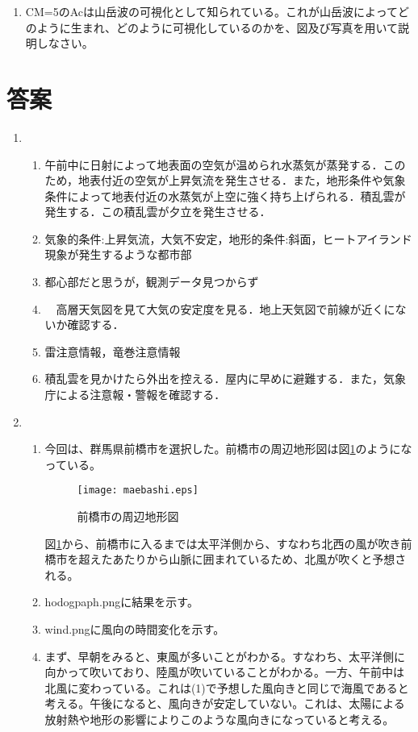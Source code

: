 \documentclass{jsarticle}
\newenvironment{problems}
{
  \renewcommand\labelenumi{\doublebox{\arabic{enumi}}}
  \begin{enumerate}
}{
  \end{enumerate}
  \renewcommand\labelenumi{\arabic{enumi}.}
}
\begin{document}
\begin{problems}
    \item CM=5のAcは山岳波の可視化として知られている。これが山岳波によってどのように生まれ、どのように可視化しているのかを、図及び写真を用いて説明しなさい。
    \end{problems}

\section{答案}

\begin{problems}
\item
        \begin{enumerate}[(1)]
        \item 午前中に日射によって地表面の空気が温められ水蒸気が蒸発する．このため，地表付近の空気が上昇気流を発生させる．また，地形条件や気象条件によって地表付近の水蒸気が上空に強く持ち上げられる．積乱雲が発生する．この積乱雲が夕立を発生させる．
        \item 気象的条件:上昇気流，大気不安定，地形的条件:斜面，ヒートアイランド現象が発生するような都市部
        \item 都心部だと思うが，観測データ見つからず
        \item　高層天気図を見て大気の安定度を見る．地上天気図で前線が近くにないか確認する．
        \item 雷注意情報，竜巻注意情報
        \item 積乱雲を見かけたら外出を控える．屋内に早めに避難する．また，気象庁による注意報・警報を確認する．
        \end{enumerate}
 \item
        \begin{enumerate}[(1)]
        \item 今回は、群馬県前橋市を選択した。前橋市の周辺地形図は図\ref{fig:maebashi}のようになっている。
        \begin{figure}[ptbh]
        \centering  %
        \texttt{[image: maebashi.eps]}
        \caption{前橋市の周辺地形図}
        \label{fig:maebashi}
        \end{figure}
        図\ref{fig:maebashi}から、前橋市に入るまでは太平洋側から、すなわち北西の風が吹き前橋市を超えたあたりから山脈に囲まれているため、北風が吹くと予想される。
        \item  hodogpaph.pngに結果を示す。
        \item wind.pngに風向の時間変化を示す。
        \item まず、早朝をみると、東風が多いことがわかる。すなわち、太平洋側に向かって吹いており、陸風が吹いていることがわかる。一方、午前中は北風に変わっている。これは(1)で予想した風向きと同じで海風であると考える。午後になると、風向きが安定していない。これは、太陽による放射熱や地形の影響によりこのような風向きになっていると考える。

\end{enumerate}
\end{problems}
\end{document}
